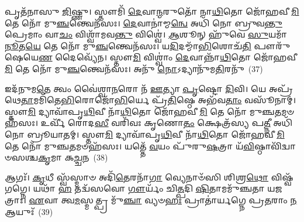 𑌪𑍃𑌤᳴𑌨𑌾𑌸𑍁 \ul{𑌜𑌿}\-𑌷𑍍𑌣𑍁। 𑌸𑍍𑌤𑍗𑌮𑌿᳴ \ul{𑌦𑍇}\-𑌵𑌾\-\ul{𑌨𑍍𑌮}\-𑌰𑍁𑌤𑍋᳴ 𑌨𑌾\-\ul{𑌥𑌿}\-𑌤𑍋 𑌜𑍋᳴𑌹𑌵𑍀\-\ul{𑌮𑌿} 𑌤𑍇 𑌨𑍋᳴ 𑌮𑍁\-\ul{𑌞𑍍𑌚}\-𑌨𑍍𑌤𑍍𑌵𑍇𑌨᳴𑌸𑌃। \ul{𑌦𑍇}\-𑌵𑌾𑌨𑌾॑𑌮𑍍𑌮\-\ul{𑌨𑍍𑌵𑍇} 𑌅𑌧𑌿᳴ 𑌨𑍋 𑌬𑍍𑌰𑍁𑌵\-\ul{𑌨𑍍𑌤𑍁} 𑌪𑍍𑌰𑍇𑌮𑌾𑌂 𑌵𑌾\-\ul{𑌚𑌂} 𑌵𑌿𑌶𑍍𑌵𑌾᳴𑌮𑌵\-\ul{𑌨𑍍𑌤𑍁} 𑌵𑌿𑌶𑍍𑌵𑍇॑। \ul{𑌆}\-𑌶𑍂𑌨𑍍 𑌹𑍁᳴𑌵𑍇 \ul{𑌸𑍁}\-𑌯𑌮𑌾᳴\-\ul{𑌨𑍂}\-𑌤\-\ul{𑌯𑍇} 𑌤𑍇 𑌨𑍋᳴ 𑌮𑍁\-\ul{𑌞𑍍𑌚}\-𑌨𑍍𑌤𑍍𑌵𑍇𑌨᳴𑌸𑌃। 𑌯\-\ul{𑌦𑌿}\-𑌦𑌮𑍍𑌮𑌾᳴\-\ul{𑌭𑌿}\-𑌶𑍋𑌚᳴\-\ul{𑌤𑌿} 𑌪𑍗𑌰𑍁᳴𑌷𑍇𑌯𑍇\-\ul{𑌣} 𑌦𑍈𑌵𑍍𑌯𑍇᳴𑌨। 𑌸𑍍𑌤𑍗\-\ul{𑌮𑌿} 𑌵𑌿𑌶𑍍𑌵𑌾𑌂॑ \ul{𑌦𑍇}\-𑌵𑌾𑌨𑍍𑌨𑌾᳴\-\ul{𑌥𑌿}\-𑌤𑍋 𑌜𑍋᳴𑌹𑌵𑍀\-\ul{𑌮𑌿} 𑌤𑍇 𑌨𑍋᳴ 𑌮𑍁\-\ul{𑌞𑍍𑌚}\-𑌨𑍍𑌤𑍍𑌵𑍇𑌨᳴𑌸𑌃। 𑌅𑌨𑍁᳴ \ul{𑌨𑍋}\-\-𑌽𑌦𑍍𑌯𑌾𑌨𑍁᳴𑌮\-\ul{𑌤𑌿}\-𑌰𑌨𑍁᳴~(37)

𑌇𑌦᳴𑌨𑍁𑌮\-\ul{𑌤𑍇} 𑌤𑍍𑌵𑌂 𑌵𑍈॑𑌶𑍍𑌵𑌾\-\ul{𑌨}\-𑌰𑍋 𑌨᳴ \ul{𑌊}\-𑌤𑍍𑌯𑌾 \ul{𑌪𑍃}\-𑌷𑍍𑌟𑍋 \ul{𑌦𑌿}\-𑌵𑌿। 𑌯𑍇 𑌅𑌪𑍍𑌰᳴𑌥𑍇\-\ul{𑌤𑌾}\-𑌮𑌮𑌿᳴𑌤𑍇\-\ul{𑌭𑌿}\-𑌰𑍋𑌜𑍋᳴\-\ul{𑌭𑌿}\-𑌰𑍍𑌯𑍇 𑌪𑍍𑌰᳴\-\ul{𑌤𑌿}\-𑌷𑍍𑌠𑍇 𑌅𑌭᳴𑌵\-\ul{𑌤𑌾𑌂} 𑌵𑌸𑍂᳴𑌨𑌾𑌮𑍍। 𑌸𑍍𑌤𑍗\-\ul{𑌮𑌿} 𑌦𑍍𑌯𑌾𑌵𑌾᳴𑌪𑍃\-\ul{𑌥𑌿}\-𑌵𑍀 𑌨𑌾᳴\-\ul{𑌥𑌿}\-𑌤𑍋 𑌜𑍋᳴𑌹𑌵𑍀\-\ul{𑌮𑌿} 𑌤𑍇 𑌨𑍋᳴ 𑌮𑍁𑌞𑍍𑌚\-\ul{𑌤}\-𑌮𑍞𑌹᳴𑌸𑌃। 𑌉𑌰𑍍𑌵𑍀᳴ 𑌰𑍋𑌦\-\ul{𑌸𑍀} 𑌵𑌰𑌿᳴𑌵𑌃 𑌕𑍃𑌣𑍋\-\ul{𑌤𑌂} 𑌕𑍍𑌷𑍇𑌤𑍍𑌰᳴𑌸𑍍𑌯 𑌪\-\ul{𑌤𑍍𑌨𑍀} 𑌅𑌧𑌿᳴ 𑌨𑍋 𑌬𑍍𑌰𑍂𑌯𑌾𑌤𑌮𑍍। 𑌸𑍍𑌤𑍗\-\ul{𑌮𑌿} 𑌦𑍍𑌯𑌾𑌵𑌾᳴𑌪𑍃\-\ul{𑌥𑌿}\-𑌵𑍀 𑌨𑌾᳴\-\ul{𑌥𑌿}\-𑌤𑍋 𑌜𑍋᳴𑌹𑌵𑍀\-\ul{𑌮𑌿} 𑌤𑍇 𑌨𑍋᳴ 𑌮𑍁𑌞𑍍𑌚\-\ul{𑌤}\-𑌮𑍞𑌹᳴𑌸𑌃। 𑌯𑌤𑍍𑌤𑍇᳴ \ul{𑌵}\-𑌯𑌂 𑌪𑍁᳴𑌰𑍁\-\ul{𑌷}\-𑌤𑍍𑌰𑌾 𑌯᳴\-\ul{𑌵𑌿}\-𑌷𑍍𑌠𑌾𑌵𑌿᳴𑌦𑍍𑌵𑌾𑍞𑌸𑌶𑍍𑌚\-\ul{𑌕𑍃}\-𑌮𑌾 𑌕\-\ul{𑌚𑍍𑌚}\-𑌨~(38)

𑌆𑌗𑌃᳴। \ul{𑌕𑍃}\-𑌧𑍀 𑌸𑍍𑌵᳴𑌸𑍍𑌮𑌾𑍞 𑌅𑌦𑌿᳴\-\ul{𑌤𑍇}\-𑌰𑌨𑌾᳴\-\ul{𑌗𑌾} 𑌵𑍍𑌯𑍇𑌨𑌾𑍞᳴𑌸𑌿 𑌶𑌿𑌶𑍍𑌰\-\ul{𑌥𑍋} 𑌵𑌿𑌷𑍍𑌵᳴𑌗𑌗𑍍𑌨𑍇। 𑌯𑌥𑌾᳴ \ul{𑌹} 𑌤𑌦𑍍𑌵᳴𑌸𑌵𑍋 \ul{𑌗𑍗}\-𑌰𑍍𑌯𑌂᳴ 𑌚𑌿\-\ul{𑌤𑍍𑌪}\-𑌦𑌿 \ul{𑌷𑌿}\-𑌤𑌾𑌮𑌮𑍁᳴𑌞𑍍𑌚𑌤𑌾 𑌯𑌜𑌤𑍍𑌰𑌾𑌃। \ul{𑌏}\-𑌵𑌾 𑌤𑍍𑌵\-\ul{𑌮}\-𑌸𑍍𑌮𑌤𑍍𑌪𑍍𑌰 𑌮𑍁᳴\-\ul{𑌞𑍍𑌚𑌾} 𑌵𑍍𑌯𑍞\-\ul{𑌹𑌃} 𑌪𑍍𑌰𑌾𑌤𑌾॑𑌰𑍍𑌯𑌗𑍍𑌨𑍇 𑌪𑍍𑌰\-\ul{𑌤}\-𑌰𑌾𑌂 \ul{𑌨} 𑌆𑌯𑍁𑌃᳴~(39)


{\anuvakamend[{𑌗𑌨𑍍𑌤𑌾᳴ \ul{𑌦𑍂}\-𑌷\-\ul{𑌯}\-𑌨𑍍𑌥𑍍𑌸𑍍𑌤𑍗\-\ul{𑌮𑌿} 𑌯\-\ul{𑌯𑍋𑌃} 𑌶𑌰𑍍𑌧𑍋\-𑌽𑌨𑍁᳴𑌮\-\ul{𑌤𑌿}\-𑌰𑌨𑍁᳴ \ul{𑌚}\-𑌨 𑌚𑌤𑍁᳴𑌸𑍍𑌤𑍍𑌰𑌿𑍞𑌶𑌚𑍍𑌚}]}%

{\anuvakamend[{\-\ul{𑌅}\-𑌗𑍍𑌨𑌿𑌷𑍍𑌟𑍍𑌵𑌾᳴ \ul{𑌵𑌾}\-𑌮\-\ul{𑌶𑍍𑌵𑍋} 𑌦𑍍𑌵𑌿𑌚᳴𑌤𑍍𑌵𑌾𑌰𑌿𑍞𑌶𑌚𑍍𑌚}]}%

